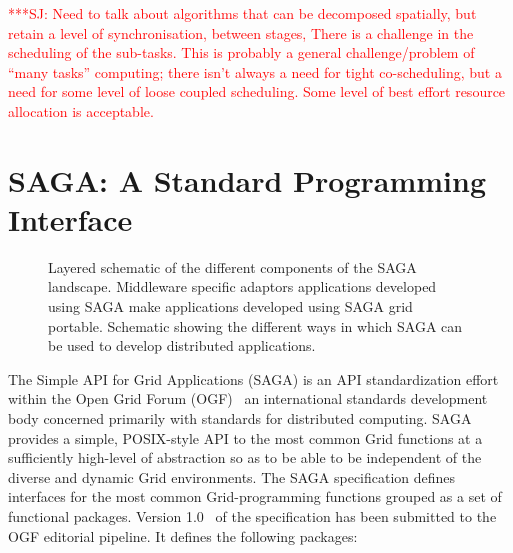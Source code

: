 \documentclass[conference,final]{IEEEtran}
\newcommand{\up}{\vspace*{-1em}}
\newcommand{\jhanote}[1]{ {\textcolor{red} { ***SJ: #1 }}}
\newcommand{\jhanote}[1]{}
\begin{document}
\jhanote{Need to talk about algorithms that can be decomposed
  spatially, but retain a level of synchronisation, between stages,
  There is a challenge in the scheduling of the sub-tasks.  This is
  probably a general challenge/problem of ``many tasks'' computing;
  there isn't always a need for tight co-scheduling, but a need for
  some level of loose coupled scheduling.  Some level of best effort
  resource allocation is acceptable.}

\up

\section{SAGA: A Standard Programming Interface}

\up

\begin{figure}[!h]
  \begin{center}
  \end{center}
  \caption{Layered schematic of the different components of the SAGA
    landscape.  Middleware specific adaptors applications developed
    using SAGA make applications developed using SAGA grid
    portable. Schematic showing the different ways in which SAGA can
    be used to develop distributed applications.\up}
 \label{sagalayer}
\end{figure}


The Simple API for Grid Applications (SAGA) is an API standardization
effort within the Open Grid Forum (OGF)~\cite{ogf_web} an
international standards development body concerned primarily with
standards for distributed computing.  SAGA provides a simple,
POSIX-style API to the most common Grid functions at a sufficiently
high-level of abstraction so as to be able to be independent of the
diverse and dynamic Grid environments.  The SAGA specification defines
interfaces for the most common Grid-programming functions grouped as a
set of functional packages.  Version 1.0~\cite{saga-core} of the
specification has been submitted to the OGF editorial pipeline.  It
defines the following packages:
\end{document}
